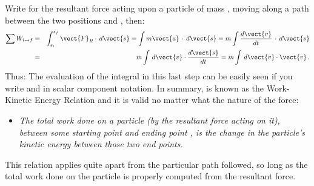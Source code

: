 {{Write  for the resultant force acting upon a particle of mass ,
moving along a path between the two positions  and , then:
\begin{eqnarray*}
\sum W_{i\rightarrow f} & = &
        \int_{s_i}^{s_f} \vect{F}_R \cdot \,d\vect{s} =
        \int m \vect{a}\,\cdot\,d\vect{s} =
        m \int \dfrac{d\vect{v}}{dt}\,\cdot\,d\vect{s} \\
                        & = &
        m \int \,d\vect{v} \cdot \dfrac{d\vect{s}}{dt} =
        m \int\,d\vect{v}\cdot \vect{v}\,. \\
\end{eqnarray*}
\noindent
Thus:
%
%
The evaluation of the integral in this last step can be easily seen if you
write  and  in scalar component notation.
%
%
In summary,
%
%
 is known as the Work-Kinetic Energy Relation and it
is valid no matter what the nature of the force:
\begin{itemize}
\item [] \textit{The total work done on a particle (by the resultant force
acting on it), between some starting point  and ending point ,
is the change in the particle's kinetic energy between those two end points.}
\end{itemize}

\noindent
This relation applies quite apart from the particular path followed, so long
as the total work done on the particle is properly computed from the
resultant force.

}}

